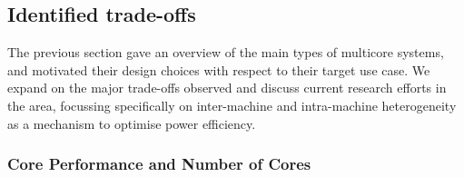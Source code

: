 \subsection{Identified trade-offs}

The previous section gave an overview of the main types of multicore systems, 
and motivated their design choices with respect to their target use case.
We expand on the major trade-offs observed and discuss current research efforts in the area, focussing specifically on inter-machine and intra-machine heterogeneity as a mechanism
to optimise power efficiency. 

\subsubsection{Core Performance and Number of Cores}


